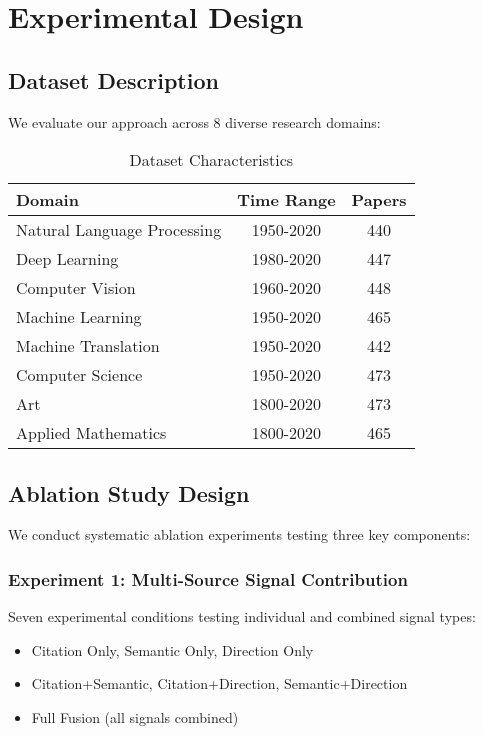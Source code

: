 \documentclass[conference]{IEEEtran}
\begin{document}
\section{Experimental Design}

\subsection{Dataset Description}

We evaluate our approach across 8 diverse research domains:

\begin{table}[htbp]
\centering
\caption{Dataset Characteristics}
\begin{tabular}{@{}lcc@{}}
\toprule
\textbf{Domain} & \textbf{Time Range} & \textbf{Papers} \\
\midrule
Natural Language Processing & 1950-2020 & 440 \\
Deep Learning & 1980-2020 & 447 \\
Computer Vision & 1960-2020 & 448 \\
Machine Learning & 1950-2020 & 465 \\
Machine Translation & 1950-2020 & 442 \\
Computer Science & 1950-2020 & 473 \\
Art & 1800-2020 & 473 \\
Applied Mathematics & 1800-2020 & 465 \\
\bottomrule
\end{tabular}
\end{table}

\subsection{Ablation Study Design}

We conduct systematic ablation experiments testing three key components:

\subsubsection{Experiment 1: Multi-Source Signal Contribution}
Seven experimental conditions testing individual and combined signal types:
\begin{itemize}
\item Citation Only, Semantic Only, Direction Only
\item Citation+Semantic, Citation+Direction, Semantic+Direction  
\item Full Fusion (all signals combined)
\end{itemize}
\end{document}
